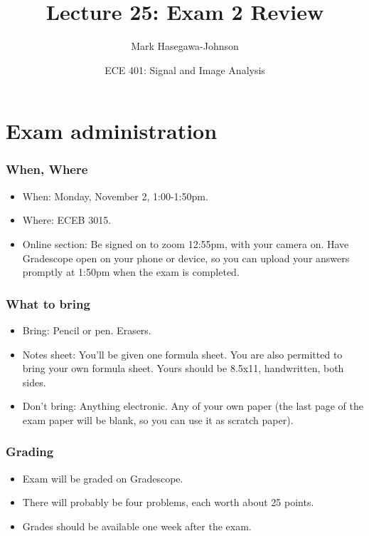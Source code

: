 \documentclass{beamer}
\title{Lecture 25: Exam 2 Review}
\author{Mark Hasegawa-Johnson}
\date{ECE 401: Signal and Image Analysis}
\begin{document}
\begin{frame}
  \maketitle
\end{frame}

\begin{frame}
  \tableofcontents
\end{frame}

\section[Administration]{Exam administration}
\setcounter{subsection}{1}

\begin{frame}
  \frametitle{When, Where}

  \begin{itemize}
  \item When: Monday, November 2, 1:00-1:50pm.
  \item Where: ECEB 3015.
  \item Online section: Be signed on to zoom 12:55pm, with your camera
    on.  Have Gradescope open on your phone or device, so you can
    upload your answers promptly at 1:50pm when the exam is completed.
  \end{itemize}
\end{frame}

\begin{frame}
  \frametitle{What to bring}

  \begin{itemize}
  \item Bring: Pencil or pen.  Erasers.
  \item Notes sheet: You'll be given one formula sheet.  You are also permitted
    to bring your own formula sheet.  Yours should be 8.5x11, handwritten, both sides.
  \item Don't bring: Anything electronic.  Any of your own paper (the
    last page of the exam paper will be blank, so you can use it as
    scratch paper).
  \end{itemize}
\end{frame}

\begin{frame}
  \frametitle{Grading}

  \begin{itemize}
  \item Exam will be graded on Gradescope.
  \item There will probably be four problems, each worth about 25 points.
  \item Grades should be available one week after the exam.
  \end{itemize}
\end{frame}
\end{document}
